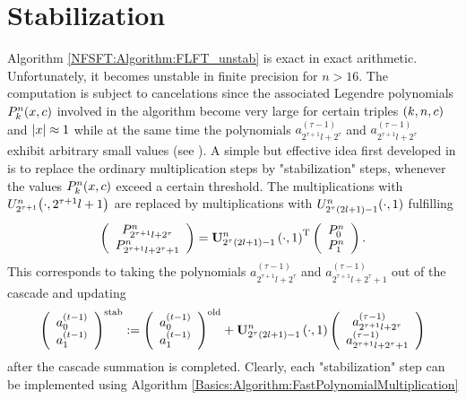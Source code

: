 \section{Stabilization}
\label{DSFT:Stabilization}
Algorithm \ref{NFSFT:Algorithm:FLFT_unstab} is exact in exact arithmetic. Unfortunately, it becomes unstable in finite precision for $n > 16$. The computation is subject to cancelations since the associated Legendre polynomials $P_{k}^n{\hspace{-0.4ex}}\left(x,c\right)$ involved in the algorithm become very large for certain triples $\left(k,n,c\right)$ and $\left\vert x\right\vert \approx 1$ while at the same time the polynomials $a_{2^{\tau+1}l+2^{\tau}}^{(\tau-1)}$ and $a_{2^{\tau+1}l+2^{\tau}}^{(\tau-1)}$ exhibit arbitrary small values (see \cite{kupo02}). A simple but effective idea first developed in \cite{postta97} is to replace the ordinary multiplication steps by "stabilization" steps, whenever the values $P_{k}^n{\hspace{-0.4ex}}\left(x,c\right)$ exceed a certain threshold. The multiplications with $U_{2^{\tau+1}}^n{\hspace{-0.4ex}}\left(\cdot,2^{\tau+1}l+1\right)$ are replaced by multiplications with $U_{2^{\tau}(2l+1)-1}^n{\hspace{-0.4ex}}\left(\cdot,1\right)$ fulfilling
$$
	\left(\begin{array}{c}
	  P_{2^{\tau+1}l+2^{\tau}}^{n}\\ 
	  P_{2^{\tau+1}l+2^{\tau}+1}^{n}
	\end{array}\right)
	=
	\mathbf{U}_{2^{\tau}(2l+1)-1}^{n}\left(\cdot,1\right)^{\text{\rm{T}}}
		\left(\begin{array}{c}
	  P_{0}^{n}\\
	  P_{1}^{n}
	\end{array}\right).
$$
This corresponds to taking the polynomials $a_{2^{\tau+1}l+2^{\tau}}^{(\tau-1)}$ and $a_{2^{\tau+1}l+2^{\tau}+1}^{(\tau-1)}$ out of the cascade and updating
$$
	\left(\begin{array}{c}
	  a_{0}^{(t-1)}\\
	  a_{1}^{(t-1)}
	\end{array}\right)^{\text{stab}}
	:=
	\left(\begin{array}{c}
	  a_{0}^{(t-1)}\\
	  a_{1}^{(t-1)}
	\end{array}\right)^{\text{old}}
  +
	\mathbf{U}_{2^{\tau}(2l+1)-1}^{n}\left(\cdot,1\right)
	\left(\begin{array}{c}
	  a_{2^{\tau+1}l+2^{\tau}}^{(\tau-1)}\\
	  a_{2^{\tau+1}l+2^{\tau}+1}^{(\tau-1)}
	\end{array}\right)  
$$
after the cascade summation is completed. Clearly, each "stabilization" step can be implemented using Algorithm \ref{Basics:Algorithm:FastPolynomialMultiplication} 
